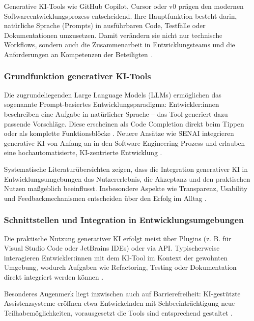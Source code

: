 \label{sec:generative-ki-tools}

Generative KI-Tools wie GitHub Copilot, Cursor oder v0 prägen den modernen
Softwareentwicklungsprozess entscheidend. Ihre Hauptfunktion besteht darin,
natürliche Sprache (Prompts) in ausführbaren Code, Testfälle oder
Dokumentationen umzusetzen. Damit verändern sie nicht nur technische Workflows,
sondern auch die Zusammenarbeit in Entwicklungsteams und die Anforderungen an
Kompetenzen der Beteiligten \cite{weisz_design_2024}.

\subsubsection{Grundfunktion generativer KI-Tools}

Die zugrundeliegenden Large Language Models (LLMs) ermöglichen das sogenannte
Prompt-basiertes Entwicklungsparadigma: Entwickler:innen beschreiben eine
Aufgabe in natürlicher Sprache – das Tool generiert dazu passende Vorschläge.
Diese erscheinen als Code Completion direkt beim Tippen oder als komplette
Funktionsblöcke \cite{kerr_github_nodate, weisz_design_2024}. Neuere Ansätze
wie SENAI integrieren generative KI von Anfang an in den
Software-Engineering-Prozess und erlauben eine hochautomatisierte,
KI-zentrierte Entwicklung \cite{saad_senai_2025}.

Systematische Literaturübersichten zeigen, dass die Integration generativer KI
in Entwicklungsumgebungen das Nutzererlebnis, die Akzeptanz und den praktischen
Nutzen maßgeblich beeinflusst. Insbesondere Aspekte wie Transparenz, Usability
und Feedbackmechanismen entscheiden über den Erfolg im Alltag
\cite{sergeyuk_human-ai_2025}.

\subsubsection{Schnittstellen und Integration in Entwicklungsumgebungen}

Die praktische Nutzung generativer KI erfolgt meist über Plugins (z. B. für
Visual Studio Code oder JetBrains IDEs) oder via API. Typischerweise
interagieren Entwickler:innen mit dem KI-Tool im Kontext der gewohnten
Umgebung, wodurch Aufgaben wie Refactoring, Testing oder Dokumentation direkt
integriert werden können \cite{kerr_github_nodate, shi_ai-assisted_2023,
    weisz_design_2024}.

Besonderes Augenmerk liegt inzwischen auch auf Barrierefreiheit: KI-gestützte
Assistenzsysteme eröffnen etwa Entwickelnden mit Sehbeeinträchtigung neue
Teilhabemöglichkeiten, vorausgesetzt die Tools sind entsprechend gestaltet
\cite{flores-saviaga_impact_2025}.

